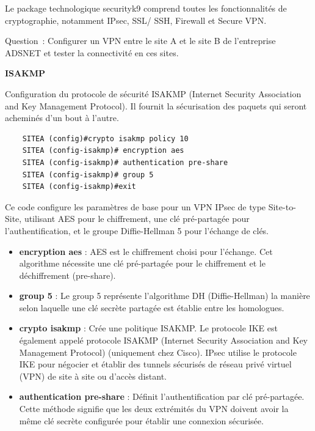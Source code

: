 \newpage

\noindent Le package technologique securityk9 comprend toutes les fonctionnalités de cryptographie, notamment IPsec, SSL/ SSH, Firewall et Secure VPN.

\vspace{0.5cm}

Question~: Configurer un VPN entre le site A et le site B de l’entreprise ADSNET et tester la connectivité en ces sites.

\vspace{0.5cm}

\noindent \textbf{ISAKMP}

\noindent Configuration du protocole de sécurité ISAKMP (Internet Security Association and Key Management Protocol). Il fournit la sécurisation des paquets qui seront acheminés d’un bout à l’autre.

\begin{center}
  \begin{verbatim}
    SITEA (config)#crypto isakmp policy 10
    SITEA (config-isakmp)# encryption aes
    SITEA (config-isakmp)# authentication pre-share
    SITEA (config-isakmp)# group 5
    SITEA (config-isakmp)#exit
  \end{verbatim}
\end{center}

\noindent Ce code configure les paramètres de base pour un VPN IPsec de type Site-to-Site, utilisant AES pour le chiffrement, une clé pré-partagée pour l'authentification, et le groupe Diffie-Hellman 5 pour l'échange de clés.

\begin{itemize}
  \item \textbf{encryption aes} : AES est le chiffrement choisi pour l’échange. Cet algorithme nécessite une clé pré-partagée pour le chiffrement et le déchiffrement (pre-share).
  \item \textbf{group 5} : Le group 5 représente l'algorithme DH (Diffie-Hellman) la manière selon laquelle une clé secrète partagée est établie entre les homologues.
  \item \textbf{crypto isakmp} : Crée une politique ISAKMP. Le protocole IKE est également appelé protocole ISAKMP (Internet Security Association and Key Management Protocol) (uniquement chez Cisco). IPsec utilise le protocole IKE pour négocier et établir des tunnels sécurisés de réseau privé virtuel (VPN) de site à site ou d’accès distant.
  \item \textbf{authentication pre-share} : Définit l'authentification par clé pré-partagée. Cette méthode signifie que les deux extrémités du VPN doivent avoir la même clé secrète configurée pour établir une connexion sécurisée.
\end{itemize}

